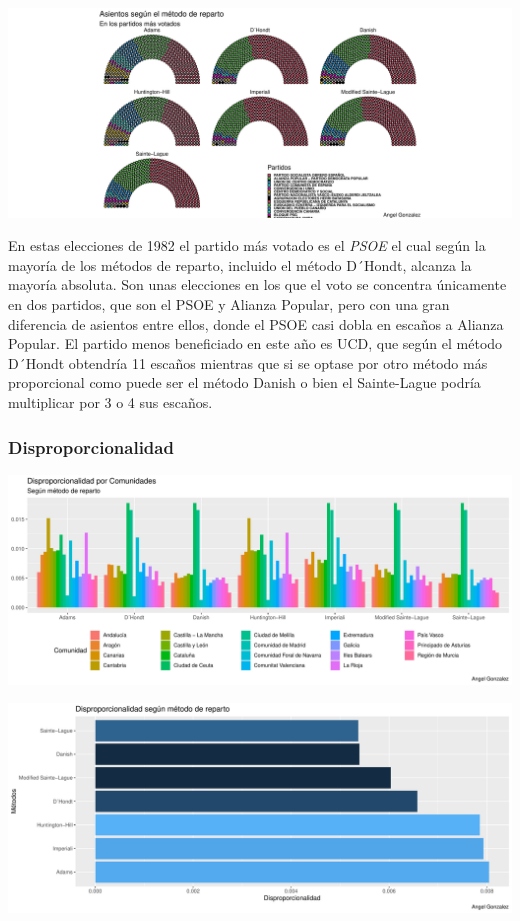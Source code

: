 \documentclass[12pt,a4paper,]{book}
\numberwithin{dummy}{section}
\theoremstyle{ocrenumbox}
\theoremstyle{blacknumex}
\theoremstyle{blacknumbox}
\theoremstyle{ocrenum}
\theoremstyle{ocrenum}
\begin{document}
\begin{center}\includegraphics[width=0.95\linewidth]{figurasR/unnamed-chunk-77-3} \end{center}

En estas elecciones de 1982 el partido más votado es el \emph{PSOE} el
cual según la mayoría de los métodos de reparto, incluido el método
D´Hondt, alcanza la mayoría absoluta. Son unas elecciones en los que el
voto se concentra únicamente en dos partidos, que son el PSOE y Alianza
Popular, pero con una gran diferencia de asientos entre ellos, donde el
PSOE casi dobla en escaños a Alianza Popular. El partido menos
beneficiado en este año es UCD, que según el método D´Hondt obtendría 11
escaños mientras que si se optase por otro método más proporcional como
puede ser el método Danish o bien el Sainte-Lague podría multiplicar por
3 o 4 sus escaños.

\hypertarget{disproporcionalidad-2}{%
\subsubsection{Disproporcionalidad}\label{disproporcionalidad-2}}

\begin{center}\includegraphics[width=0.95\linewidth]{figurasR/unnamed-chunk-78-1} \end{center}

\begin{center}\includegraphics[width=0.95\linewidth]{figurasR/unnamed-chunk-78-2} \end{center}
\end{document}
